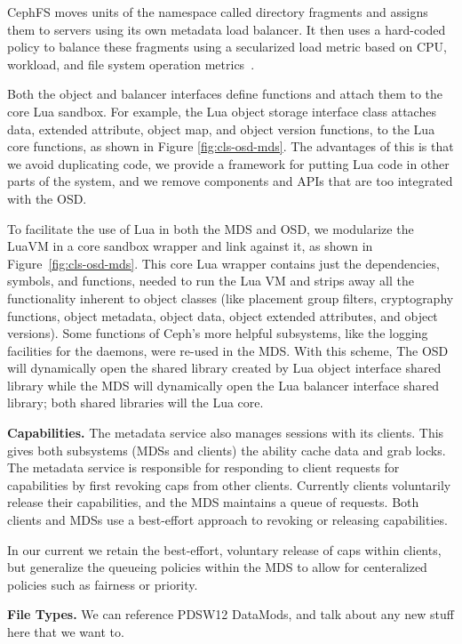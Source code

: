 \documentclass[10pt,twocolumn]{article}
\begin{document}
CephFS moves units of the namespace called directory fragments and assigns
them to servers using  its own metadata load balancer. It then uses a
hard-coded policy to balance these fragments using a secularized load metric
based on CPU, workload, and file system operation
metrics~\cite{sevilla:sc15-mantle}.

Both the object and balancer interfaces define functions and attach them
to the core Lua sandbox. For example, the Lua object storage interface
class attaches data, extended attribute, object map, and object version
functions, to the Lua core functions, as shown in Figure
\ref{fig:cls-osd-mds}. The advantages of this is that we avoid
duplicating code, we provide a framework for putting Lua code in other
parts of the system, and we remove components and APIs that are too
integrated with the OSD.

To facilitate the use of Lua in both the MDS and OSD, we modularize the LuaVM
in a core sandbox wrapper and link against it, as shown in
Figure~\ref{fig:cls-osd-mds}. This core Lua wrapper contains just the
dependencies, symbols, and functions, needed to run the Lua VM and strips away
all the functionality inherent to object classes (like placement group
filters, cryptography functions, object metadata,  object data, object
extended attributes, and object versions). Some functions of Ceph's more
helpful subsystems, like the logging facilities for the daemons, were re-used
in the MDS.  With this scheme, The OSD will dynamically open the shared
library created by Lua object interface shared library while the MDS will
dynamically open the Lua balancer interface shared library; both shared
libraries will the Lua core.

{\bf Capabilities.}
The metadata service also manages sessions with its clients. This gives both
subsystems (MDSs and clients) the ability cache data and grab locks. The
metadata service is responsible for responding to client requests for
capabilities by first revoking caps from other clients. Currently clients
voluntarily release their capabilities, and the MDS maintains a queue of
requests.  Both clients and MDSs use a best-effort approach to revoking or
releasing capabilities.

In our current we retain the best-effort, voluntary release of caps within
clients, but generalize the queueing policies within the MDS to allow for
centeralized policies such as fairness or priority.

{\bf File Types.}
We can reference PDSW12 DataMods, and talk about any new stuff here that we
want to.
\end{document}
